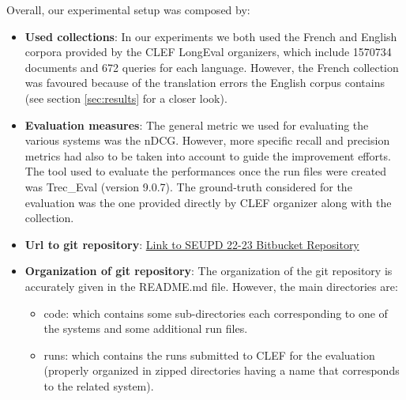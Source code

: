 Overall, our experimental setup was composed by:
\begin{itemize}
	\item \textbf{Used collections}: In our experiments we both used the French and English corpora provided by the CLEF LongEval organizers, which include 1570734 documents and 672 queries for each language. However, the French collection was favoured because of the translation errors the English corpus contains (see section \ref{sec:results} for a closer look).  
 
	\item \textbf{Evaluation measures}: The general metric we used for evaluating the various systems was the nDCG. However, more specific recall and precision metrics had also to be taken into account to guide the improvement efforts. The tool used to evaluate the performances once the run files were created was Trec\_Eval (version 9.0.7). The ground-truth considered for the evaluation was the one provided directly by CLEF organizer along with the collection.

 
	\item \textbf{Url to git repository}: \href{https://bitbucket.org/upd-dei-stud-prj/seupd2223-dards/src/master/}{Link to SEUPD 22-23 Bitbucket Repository}



 
        \item \textbf{Organization of git repository}: The organization of the git repository is accurately given in the README.md file. However, the main directories are:
            \begin{itemize}
                \item code: which contains some sub-directories each corresponding to one of the systems and some additional run files.
                \item runs: which contains the runs submitted to CLEF for the evaluation (properly organized in zipped directories having a name that corresponds to the related system).
            \end{itemize}



\end{itemize}
